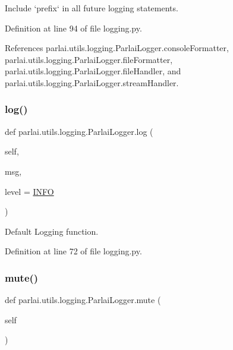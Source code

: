\begin{DoxyVerb}Include `prefix` in all future logging statements.\end{DoxyVerb}
 

Definition at line 94 of file logging.\+py.



References parlai.\+utils.\+logging.\+Parlai\+Logger.\+console\+Formatter, parlai.\+utils.\+logging.\+Parlai\+Logger.\+file\+Formatter, parlai.\+utils.\+logging.\+Parlai\+Logger.\+file\+Handler, and parlai.\+utils.\+logging.\+Parlai\+Logger.\+stream\+Handler.

\mbox{\label{classparlai_1_1utils_1_1logging_1_1ParlaiLogger_aa545862a0e5c55d67989cc8ea7d545a1}} 
\subsubsection{\texorpdfstring{log()}{log()}}
{\footnotesize\ttfamily def parlai.\+utils.\+logging.\+Parlai\+Logger.\+log (\begin{DoxyParamCaption}\item[{}]{self,  }\item[{}]{msg,  }\item[{}]{level = {\ttfamily \hyperlink{namespaceparlai_1_1utils_1_1logging_a4bc2de74317465e5d1a8b5d7b913d48a}{I\+N\+FO}} }\end{DoxyParamCaption})}

\begin{DoxyVerb}Default Logging function.\end{DoxyVerb}
 

Definition at line 72 of file logging.\+py.

\mbox{\label{classparlai_1_1utils_1_1logging_1_1ParlaiLogger_a560f0cf26c3eaae2d785c4f35cae2c4b}} 
\subsubsection{\texorpdfstring{mute()}{mute()}}
{\footnotesize\ttfamily def parlai.\+utils.\+logging.\+Parlai\+Logger.\+mute (\begin{DoxyParamCaption}\item[{}]{self }\end{DoxyParamCaption})}

